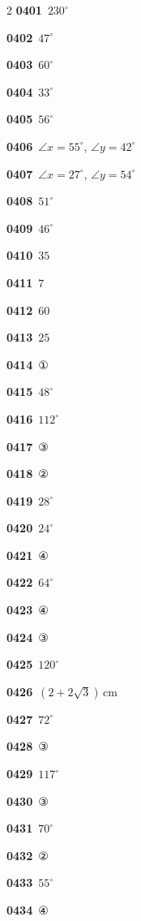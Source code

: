\documentclass[10pt,a4paper]{article}
\begin{document}
\begin{multicols}{2}
\noindent\textbf{0401}\ $230^\circ$\par
\noindent\textbf{0402}\ $47^\circ$\par
\noindent\textbf{0403}\ $60^\circ$\par
\noindent\textbf{0404}\ $33^\circ$\par
\noindent\textbf{0405}\ $56^\circ$\par
\noindent\textbf{0406}\ $\angle x=55^\circ$, $\angle y=42^\circ$\par
\noindent\textbf{0407}\ $\angle x=27^\circ$, $\angle y=54^\circ$\par
\noindent\textbf{0408}\ $51^\circ$\par
\noindent\textbf{0409}\ $46^\circ$\par
\noindent\textbf{0410}\ $35$\par
\noindent\textbf{0411}\ $7$\par
\noindent\textbf{0412}\ $60$\par
\noindent\textbf{0413}\ $25$\par
\noindent\textbf{0414}\ ①\par
\noindent\textbf{0415}\ $48^\circ$\par
\noindent\textbf{0416}\ $112^\circ$\par
\noindent\textbf{0417}\ ③\par
\noindent\textbf{0418}\ ②\par
\noindent\textbf{0419}\ $28^\circ$\par
\noindent\textbf{0420}\ $24^\circ$\par
\noindent\textbf{0421}\ ④\par
\noindent\textbf{0422}\ $64^\circ$\par
\noindent\textbf{0423}\ ④\par
\noindent\textbf{0424}\ ③\par
\noindent\textbf{0425}\ $120^\circ$\par
\noindent\textbf{0426}\ $(2+2\sqrt{3})\,\mathrm{cm}$\par
\noindent\textbf{0427}\ $72^\circ$\par
\noindent\textbf{0428}\ ③\par
\noindent\textbf{0429}\ $117^\circ$\par
\noindent\textbf{0430}\ ③\par
\noindent\textbf{0431}\ $70^\circ$\par
\noindent\textbf{0432}\ ②\par
\noindent\textbf{0433}\ $55^\circ$\par
\noindent\textbf{0434}\ ④\par

\end{multicols}
\end{document}
